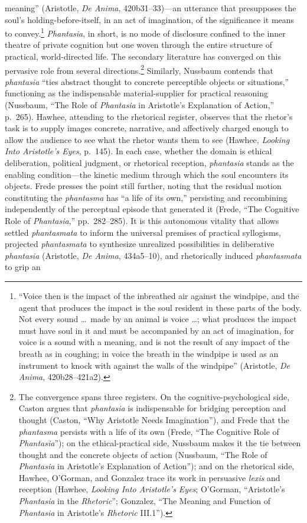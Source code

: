 meaning'' (Aristotle, \textit{De Anima}, 420b31--33)---an utterance that presupposes the soul's holding-before-itself, in an act of imagination, of the significance it means to convey.\footnote{``Voice then is the impact of the inbreathed air against the windpipe, and the agent that produces the impact is the soul resident in these parts of the body. Not every sound \ldots\ made by an animal is voice \ldots; what produces the impact must have soul in it and must be accompanied by an act of imagination, for voice is a sound with a meaning, and is not the result of any impact of the breath as in coughing; in voice the breath in the windpipe is used as an instrument to knock with against the walls of the windpipe'' (Aristotle, \textit{De Anima}, 420b28--421a2).} \textit{Phantasia}, in short, is no mode of disclosure confined to the inner theatre of private cognition but one woven through the entire structure of practical, world-directed life. The secondary literature has converged on this pervasive role from several directions.\footnote{The convergence spans three registers. On the cognitive-psychological side, Caston argues that \textit{phantasia} is indispensable for bridging perception and thought (Caston, ``Why Aristotle Needs Imagination''), and Frede that the \textit{phantasma} persists with a life of its own (Frede, ``The Cognitive Role of \textit{Phantasia}''); on the ethical-practical side, Nussbaum makes it the tie between thought and the concrete objects of action (Nussbaum, ``The Role of \textit{Phantasia} in Aristotle's Explanation of Action''); and on the rhetorical side, Hawhee, O'Gorman, and Gonzalez trace its work in persuasive \textit{lexis} and reception (Hawhee, \textit{Looking Into Aristotle's Eyes}; O'Gorman, ``Aristotle's \textit{Phantasia} in the \textit{Rhetoric}''; Gonzalez, ``The Meaning and Function of \textit{Phantasia} in Aristotle's \textit{Rhetoric} III.1'').} Similarly, Nussbaum contends that \textit{phantasia} ``ties abstract thought to concrete perceptible objects or situations,'' functioning as the indispensable material-supplier for practical reasoning (Nussbaum, ``The Role of \textit{Phantasia} in Aristotle's Explanation of Action,'' p.~265). Hawhee, attending to the rhetorical register, observes that the rhetor's task is to supply images concrete, narrative, and affectively charged enough to allow the audience to see what the rhetor wants them to see (Hawhee, \textit{Looking Into Aristotle's Eyes}, p.~145). In each case, whether the domain is ethical deliberation, political judgment, or rhetorical reception, \textit{phantasia} stands as the enabling condition---the kinetic medium through which the soul encounters its objects. Frede presses the point still further, noting that the residual motion constituting the \textit{phantasma} has ``a life of its own,'' persisting and recombining independently of the perceptual episode that generated it (Frede, ``The Cognitive Role of \textit{Phantasia},'' pp.~282--285). It is this autonomous vitality that allows settled \textit{phantasmata} to inform the universal premises of practical syllogisms, projected \textit{phantasmata} to synthesize unrealized possibilities in deliberative \textit{phantasia} (Aristotle, \textit{De Anima}, 434a5--10), and rhetorically induced \textit{phantasmata} to grip an 